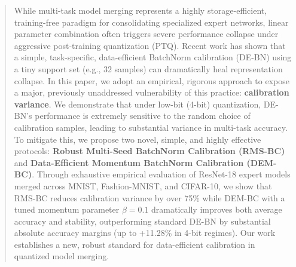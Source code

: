 \documentclass{article}
\begin{document}

\printAffiliationsAndNotice{}

\begin{abstract}
While multi-task model merging represents a highly storage-efficient, training-free paradigm for consolidating specialized expert networks, linear parameter combination often triggers severe performance collapse under aggressive post-training quantization (PTQ). Recent work has shown that a simple, task-specific, data-efficient BatchNorm calibration (DE-BN) using a tiny support set (e.g., 32 samples) can dramatically heal representation collapse. In this paper, we adopt an empirical, rigorous approach to expose a major, previously unaddressed vulnerability of this practice: \textbf{calibration variance}. We demonstrate that under low-bit (4-bit) quantization, DE-BN's performance is extremely sensitive to the random choice of calibration samples, leading to substantial variance in multi-task accuracy. To mitigate this, we propose two novel, simple, and highly effective protocols: \textbf{Robust Multi-Seed BatchNorm Calibration (RMS-BC)} and \textbf{Data-Efficient Momentum BatchNorm Calibration (DEM-BC)}. Through exhaustive empirical evaluation of ResNet-18 expert models merged across MNIST, Fashion-MNIST, and CIFAR-10, we show that RMS-BC reduces calibration variance by over 75\% while DEM-BC with a tuned momentum parameter $\beta = 0.1$ dramatically improves both average accuracy and stability, outperforming standard DE-BN by substantial absolute accuracy margins (up to +11.28\% in 4-bit regimes). Our work establishes a new, robust standard for data-efficient calibration in quantized model merging.
\end{abstract}
\end{document}
